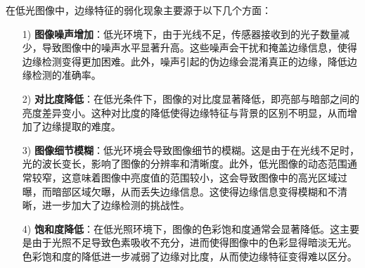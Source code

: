 \documentclass[a4paper]{ctexart}
\begin{document}
	
	
	在低光图像中，边缘特征的弱化现象主要源于以下几个方面：
	
	\begin{itemize}
		\item[1)] 
		\textbf{图像噪声增加}：低光环境下，由于光线不足，传感器接收到的光子数量减少，导致图像中的噪声水平显著升高。这些噪声会干扰和掩盖边缘信息，使得边缘检测变得更加困难。此外，噪声引起的伪边缘会混淆真正的边缘，降低边缘检测的准确率。
		
		\item[2)] 
		\textbf{对比度降低}：在低光条件下，图像的对比度显著降低，即亮部与暗部之间的亮度差异变小。这种对比度的降低使得边缘特征与背景的区别不明显，从而增加了边缘提取的难度。
		
		\item[3)] 
		\textbf{图像细节模糊}：低光环境会导致图像细节的模糊。这是由于在光线不足时，光的波长变长，影响了图像的分辨率和清晰度。此外，低光图像的动态范围通常较窄，这意味着图像中亮度值的范围较小，这会导致图像中的高光区域过曝，而暗部区域欠曝，从而丢失边缘信息。这使得边缘信息变得模糊和不清晰，进一步加大了边缘检测的挑战性。
		
		\item[4)]
		\textbf{饱和度降低}：在低光照环境下，图像的色彩饱和度通常会显著降低。这主要是由于光照不足导致色素吸收不充分，进而使得图像中的色彩显得暗淡无光。色彩饱和度的降低进一步减弱了边缘对比度，从而使边缘特征变得难以区分。
		
		
	\end{itemize}
	
\end{document}
